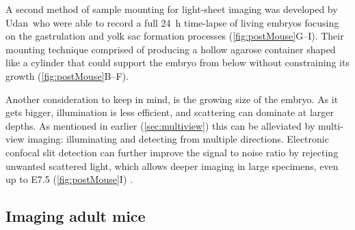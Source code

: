     A second method of sample mounting for light-sheet imaging was developed by Udan~\etal who were able to record a full \SI{24}{h} time-lapse of living embryos focusing on the gastrulation and yolk sac formation processes (\autoref{fig:postMouse}G--I). Their mounting technique comprised of producing a hollow agarose container shaped like a cylinder that could support the embryo from below without constraining its growth (\autoref{fig:postMouse}B--F).

    Another consideration to keep in mind, is the growing size of the embryo. As it gets bigger, illumination is less efficient, and scattering can dominate at larger depths. As mentioned in earlier (\autoref{sec:multiview}) this can be alleviated by multi-view imaging: illuminating and detecting from multiple directions. Electronic confocal slit detection can further improve the signal to noise ratio by rejecting unwanted scattered light, which allows deeper imaging in large specimens, even up to E7.5 (\autoref{fig:postMouse}I) \cite{de_medeiros_confocal_2015}.

  \subsection{Imaging adult mice}
    
